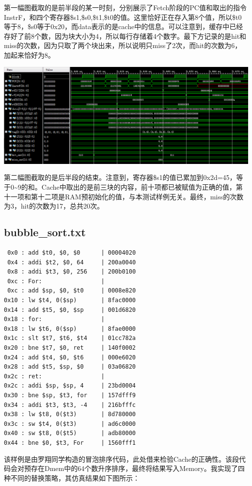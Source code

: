 \documentclass[12pt]{article} %
\begin{document}
\begin{sloppypar}
第一幅图截取的是前半段的某一时刻，分别展示了Fetch阶段的PC值和取出的指令InstrF，和四个寄存器\$s1,\$s0,\$t1,\$t0的值。这里恰好正在存入第8个值，所以\$t0等于8，\$s0等于0x20，而data表示的是cache中的信息。可以注意到，缓存中已经存好了前8个数，因为块大小为4，所以每行存储着4个数字。最下方记录的是hit和miss的次数，因为只取了两个块出来，所以说明只miss了2次，而hit的次数为6，加起来恰好为8。

\noindent
\includegraphics[width=\linewidth]{figure/swlw2.png}

第二幅图截取的是后半段的结束。注意到，寄存器\$s1的值已累加到0x2d=45，等于0\~{}9的和。Cache中取出的是前三块的内容，前十项都已被赋值为正确的值，第十一项和第十二项是RAM预初始化的值，与本测试样例无关。最终，miss的次数为3，hit的次数为17，总共20次。

\subsection{bubble\_sort.txt}

\begin{lstlisting}
 0x0 : add $t0, $0, $0      | 00004020
 0x4 : addi $t2, $0, 64     | 200a0040
 0x8 : addi $t3, $0, 256    | 200b0100
 0xc : For:                 | 
 0xc : add $sp, $0, $t0     | 0008e820
0x10 : lw $t4, 0($sp)       | 8fac0000
0x14 : add $t5, $0, $sp     | 001d6820
0x18 : for:                 | 
0x18 : lw $t6, 0($sp)       | 8fae0000
0x1c : slt $t7, $t6, $t4    | 01cc782a
0x20 : bne $t7, $0, ret     | 140f0002
0x24 : add $t4, $0, $t6     | 000e6020
0x28 : add $t5, $sp, $0     | 03a06820
0x2c : ret:                 | 
0x2c : addi $sp, $sp, 4     | 23bd0004
0x30 : bne $sp, $t3, for    | 157dfff9
0x34 : addi $t3, $t3, -4    | 216bfffc
0x38 : lw $t8, 0($t3)       | 8d780000
0x3c : sw $t4, 0($t3)       | ad6c0000
0x40 : sw $t8, 0($t5)       | adb80000
0x44 : bne $0, $t3, For     | 1560fff1
\end{lstlisting}

该样例是由罗翔同学构造的冒泡排序代码，此处借来检验Cache的正确性。该段代码会对预存在Dmem中的64个数升序排序，最终将结果写入Memory。我实现了四种不同的替换策略，其仿真结果如下图所示：


\end{sloppypar}
\end{document}
